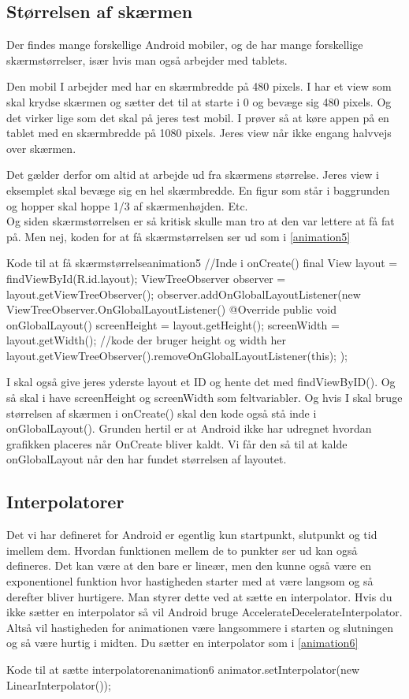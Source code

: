 \subsection{Størrelsen af skærmen}
Der findes mange forskellige Android mobiler, og de har mange forskellige skærmstørrelser, især hvis man også arbejder med tablets. 
\begin{example}
	Den mobil I arbejder med har en skærmbredde på 480 pixels. I har et view som skal krydse skærmen og sætter det til at starte i 0 og bevæge sig 480 pixels. Og det virker lige som det skal på jeres test mobil. I prøver så at køre appen på en tablet med en skærmbredde på 1080 pixels. Jeres view når ikke engang halvvejs over skærmen. 
\end{example}
Det gælder derfor om altid at arbejde ud fra skærmens størrelse. Jeres view i eksemplet skal bevæge sig en hel skærmbredde. En figur som står i baggrunden og hopper skal hoppe 1/3 af skærmenhøjden. Etc.\\

Og siden skærmstørrelsen er så kritisk skulle man tro at den var lettere at få fat på. Men nej, koden for at få skærmstørrelsen ser ud som i \autoref{animation5}
\begin{JavaCode}{Kode til at få skærmstørrelse}{animation5}
	//Inde i onCreate()
	final View layout = findViewById(R.id.layout);
	ViewTreeObserver observer = layout.getViewTreeObserver();
	observer.addOnGlobalLayoutListener(new ViewTreeObserver.OnGlobalLayoutListener() {
		@Override
		public void onGlobalLayout() {
			screenHeight = layout.getHeight();
			screenWidth = layout.getWidth();
			//kode der bruger height og width her
			layout.getViewTreeObserver().removeOnGlobalLayoutListener(this);
		}
	});
\end{JavaCode}

I skal også give jeres yderste layout et ID og hente det med findViewByID(). Og så skal i have screenHeight og screenWidth som feltvariabler. Og hvis I skal bruge størrelsen af skærmen i onCreate() skal den kode også stå inde i onGlobalLayout().
Grunden hertil er at Android ikke har udregnet hvordan grafikken placeres når OnCreate bliver kaldt. Vi får den så til at kalde onGlobalLayout når den har fundet størrelsen af layoutet.
\subsection{Interpolatorer}
Det vi har defineret for Android er egentlig kun startpunkt, slutpunkt og tid imellem dem. Hvordan funktionen mellem de to punkter ser ud kan også defineres. Det kan være at den bare er lineær, men den kunne også være en exponentionel funktion hvor hastigheden starter med at være langsom og så derefter bliver hurtigere. Man styrer dette ved at sætte en interpolator. 
Hvis du ikke sætter en interpolator så vil Android bruge AccelerateDecelerateInterpolator. Altså vil hastigheden for animationen være langsommere i starten og slutningen og så være hurtig i midten. Du sætter en interpolator som i \autoref{animation6}
\begin{JavaCode}{Kode til at sætte interpolatoren}{animation6}
	animator.setInterpolator(new LinearInterpolator());
\end{JavaCode}

